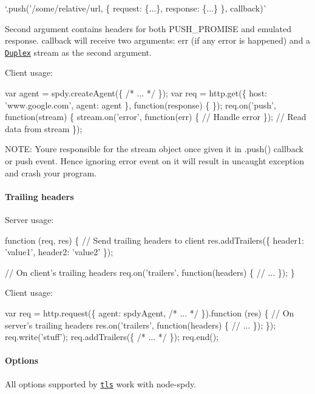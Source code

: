 `.push('/some/relative/url\textquotesingle{}, \{ request\+: \{...\}, response\+: \{...\} \}, callback)\`{}

Second argument contains headers for both P\+U\+S\+H\+\_\+\+P\+R\+O\+M\+I\+SE and emulated response. {\ttfamily callback} will receive two arguments\+: {\ttfamily err} (if any error is happened) and a \href{https://iojs.org/api/stream.html#stream_class_stream_duplex}{\tt Duplex} stream as the second argument.

Client usage\+: 
\begin{DoxyCode}
var agent = spdy.createAgent(\{ /* ... */ \});
var req = http.get(\{
  host: 'www.google.com',
  agent: agent
\}, function(response) \{
\});
req.on('push', function(stream) \{
  stream.on('error', function(err) \{
    // Handle error
  \});
  // Read data from stream
\});
\end{DoxyCode}


N\+O\+TE\+: You\textquotesingle{}re responsible for the {\ttfamily stream} object once given it in {\ttfamily .push()} callback or {\ttfamily push} event. Hence ignoring {\ttfamily error} event on it will result in uncaught exception and crash your program.

\paragraph*{Trailing headers}

Server usage\+: 
\begin{DoxyCode}
function (req, res) \{
  // Send trailing headers to client
  res.addTrailers(\{ header1: 'value1', header2: 'value2' \});

  // On client's trailing headers
  req.on('trailers', function(headers) \{
    // ...
  \});
\}
\end{DoxyCode}


Client usage\+: 
\begin{DoxyCode}
var req = http.request(\{ agent: spdyAgent, /* ... */ \}).function (res) \{
  // On server's trailing headers
  res.on('trailers', function(headers) \{
    // ...
  \});
\});
req.write('stuff');
req.addTrailers(\{ /* ... */ \});
req.end();
\end{DoxyCode}


\paragraph*{Options}

All options supported by \href{http://nodejs.org/docs/latest/api/tls.html#tls.createServer}{\tt tls} work with node-\/spdy.

